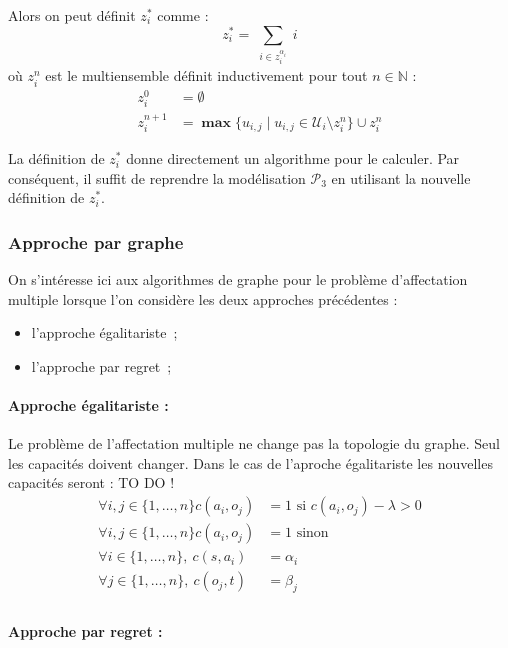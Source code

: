 \documentclass[a4paper, titlepage, oneside, 12pt]{article}%
\newcommand\boldmax{\mathop{\mathbf{max}}}
\begin{document}
Alors on peut définit $z_i^*$ comme :
$$z_i^*=\sum_{\substack{i \in z_i^{\alpha_i}}} i$$ 
où $z_i^{n}$ est le multiensemble définit inductivement pour tout $n\in \mathbb{N}$ : 
\begin{align*}
z_i^0 &= \emptyset \\
z_i^{n+1} &= \boldmax \{u_{i,j} \mid u_{i,j} \in \mathcal{U}_i \setminus z_i^{n} \} \cup z_i^{n} 
\end{align*} 

La définition de $z_i^*$ donne directement un algorithme pour le calculer. Par conséquent, il suffit de reprendre la modélisation $\mathcal{P}_3$ en utilisant la nouvelle définition de $z_i^*$.

\subsubsection{Approche par graphe}

On s'intéresse ici aux algorithmes de graphe pour le problème d'affectation multiple lorsque l'on considère les deux approches précédentes :
\begin{itemize}
\item l'approche égalitariste~;
\item l'approche par regret~;
\end{itemize}

\paragraph{Approche égalitariste :}

Le problème de l'affectation multiple ne change pas la topologie du graphe. Seul les capacités doivent changer. Dans le cas de l'aproche égalitariste les nouvelles capacités seront : 
TO DO !
\begin{align*}
\forall i,j \in \{1, \dots, n\} c(a_i,o_j)&=1 \mbox{ si } c(a_i,o_j)-\lambda>0\\
\forall i,j \in \{1, \dots, n\} c(a_i,o_j)&=1 \mbox{ sinon}\\
\forall i \in \{1, \dots, n\},\ c(s,a_i)&=\alpha_i\\
\forall j \in \{1, \dots, n\},\ c(o_j,t)&=\beta_j\\
\end{align*}

\paragraph{Approche par regret : }
\end{document}
